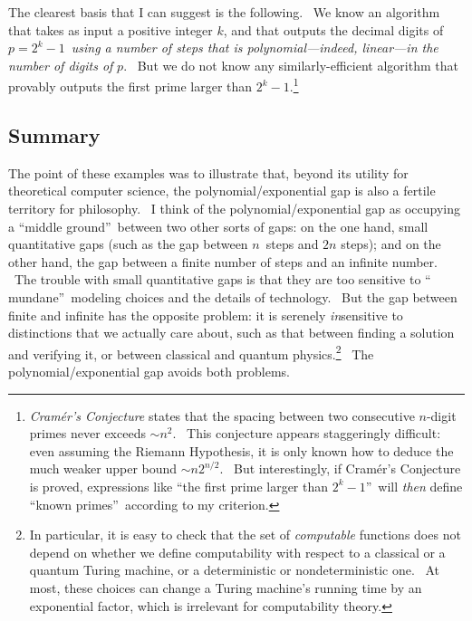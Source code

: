 \documentclass[12pt,onecolumn]{article}%
\begin{document}
The clearest basis that I can suggest is the following. \ We know an algorithm
that takes as input a positive integer $k$, and that outputs the decimal
digits of $p=2^{k}-1$\ \textit{using a number of steps that is
polynomial---indeed, linear---in the number of digits of }$p$. \ But we do not
know any similarly-efficient algorithm that provably outputs the first prime
larger than $2^{k}-1$.\footnote{\textit{Cram\'{e}r's Conjecture} states that
the spacing between two consecutive $n$-digit primes never exceeds $\sim
n^{2}$. \ This conjecture appears staggeringly difficult: even assuming the
Riemann Hypothesis, it is only known how to deduce the much weaker upper bound
$\sim n2^{n/2}$. \ But interestingly, if Cram\'{e}r's Conjecture is proved,
expressions like \textquotedblleft the first prime larger than $2^{k}%
-1$\textquotedblright\ will \textit{then} define \textquotedblleft known
primes\textquotedblright\ according to my criterion.}

\subsection{Summary}

The point of these examples was to illustrate that, beyond its utility for
theoretical computer science, the polynomial/exponential gap is also a fertile
territory for philosophy. \ I think of the polynomial/exponential gap as
occupying a \textquotedblleft middle ground\textquotedblright\ between two
other sorts of gaps: on the one hand, small quantitative gaps (such as the gap
between $n$\ steps and $2n$ steps); and on the other hand, the gap between a
finite number of steps and an infinite number. \ The trouble with small
quantitative gaps is that they are too sensitive to \textquotedblleft
mundane\textquotedblright\ modeling choices and the details of technology.
\ But the gap between finite and infinite has the opposite problem: it is
serenely \textit{in}sensitive to distinctions that we actually care about,
such as that between finding a solution and verifying it, or between classical
and quantum physics.\footnote{In particular, it is easy to check that the set
of \textit{computable} functions does not depend on whether we define
computability with respect to a classical or a quantum Turing machine, or a
deterministic or nondeterministic one. \ At most, these choices can change a
Turing machine's running time by an exponential factor, which is irrelevant
for computability theory.} \ The polynomial/exponential gap avoids both problems.
\end{document}
